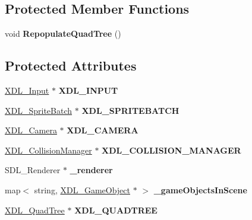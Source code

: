 \subsection*{Protected Member Functions}
\begin{DoxyCompactItemize}
\item 
\hypertarget{class_x_d_l___scene_a2c15ca640061043c77e6e2c2db4fd6ab}{void {\bfseries Repopulate\-Quad\-Tree} ()}\label{class_x_d_l___scene_a2c15ca640061043c77e6e2c2db4fd6ab}

\end{DoxyCompactItemize}
\subsection*{Protected Attributes}
\begin{DoxyCompactItemize}
\item 
\hypertarget{class_x_d_l___scene_a06c4466438cf7260b1ffda8e7f900239}{\hyperlink{class_x_d_l___input}{X\-D\-L\-\_\-\-Input} $\ast$ {\bfseries X\-D\-L\-\_\-\-I\-N\-P\-U\-T}}\label{class_x_d_l___scene_a06c4466438cf7260b1ffda8e7f900239}

\item 
\hypertarget{class_x_d_l___scene_a70673f995f806f2ae20cc2f535f30bab}{\hyperlink{class_x_d_l___sprite_batch}{X\-D\-L\-\_\-\-Sprite\-Batch} $\ast$ {\bfseries X\-D\-L\-\_\-\-S\-P\-R\-I\-T\-E\-B\-A\-T\-C\-H}}\label{class_x_d_l___scene_a70673f995f806f2ae20cc2f535f30bab}

\item 
\hypertarget{class_x_d_l___scene_aea41b1e2980f0cd93e97f65fce346f53}{\hyperlink{class_x_d_l___camera}{X\-D\-L\-\_\-\-Camera} $\ast$ {\bfseries X\-D\-L\-\_\-\-C\-A\-M\-E\-R\-A}}\label{class_x_d_l___scene_aea41b1e2980f0cd93e97f65fce346f53}

\item 
\hypertarget{class_x_d_l___scene_a3045df7fb476b322f1e06d1b81df0cc4}{\hyperlink{class_x_d_l___collision_manager}{X\-D\-L\-\_\-\-Collision\-Manager} $\ast$ {\bfseries X\-D\-L\-\_\-\-C\-O\-L\-L\-I\-S\-I\-O\-N\-\_\-\-M\-A\-N\-A\-G\-E\-R}}\label{class_x_d_l___scene_a3045df7fb476b322f1e06d1b81df0cc4}

\item 
\hypertarget{class_x_d_l___scene_a923ee55d91647c14f2566f1aa70e3aed}{S\-D\-L\-\_\-\-Renderer $\ast$ {\bfseries \-\_\-renderer}}\label{class_x_d_l___scene_a923ee55d91647c14f2566f1aa70e3aed}

\item 
\hypertarget{class_x_d_l___scene_aad1feb840a1c2925324ccce29fa1d3a4}{map$<$ string, \hyperlink{class_x_d_l___game_object}{X\-D\-L\-\_\-\-Game\-Object} $\ast$ $>$ {\bfseries \-\_\-game\-Objects\-In\-Scene}}\label{class_x_d_l___scene_aad1feb840a1c2925324ccce29fa1d3a4}

\item 
\hypertarget{class_x_d_l___scene_a41e02caab41a03ecdf57d011c853f2c9}{\hyperlink{class_x_d_l___quad_tree}{X\-D\-L\-\_\-\-Quad\-Tree} $\ast$ {\bfseries X\-D\-L\-\_\-\-Q\-U\-A\-D\-T\-R\-E\-E}}\label{class_x_d_l___scene_a41e02caab41a03ecdf57d011c853f2c9}

\end{DoxyCompactItemize}


